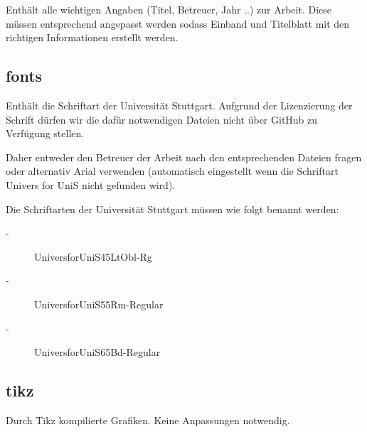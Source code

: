 Enthält alle wichtigen Angaben (Titel, Betreuer, Jahr ..) zur Arbeit. Diese müssen entsprechend angepasst werden sodass Einband und Titelblatt mit den richtigen Informationen erstellt werden.

\subsection*{fonts}
Enthält die Schriftart der Universität Stuttgart. Aufgrund der Lizenzierung der Schrift dürfen wir die dafür notwendigen Dateien nicht über GitHub zu Verfügung stellen. 

Daher entweder den Betreuer der Arbeit nach den entsprechenden Dateien fragen oder alternativ Arial verwenden (automatisch eingestellt wenn die Schriftart Univers for UniS nicht gefunden wird).

Die Schriftarten der Universität Stuttgart müssen wie folgt benannt werden:

\begin{description}
	\item[-] UniversforUniS45LtObl-Rg
	\item[-] UniversforUniS55Rm-Regular
	\item[-] UniversforUniS65Bd-Regular
\end{description}

\subsection*{tikz}
Durch Tikz kompilierte Grafiken. Keine Anpassungen notwendig.

